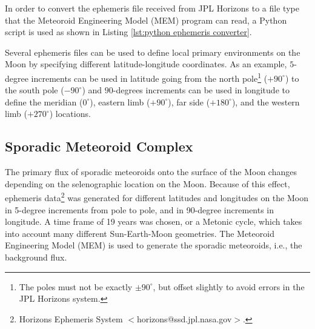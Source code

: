 \documentclass{article}
\begin{document}
In order to convert the ephemeris file received from JPL Horizons to a file type that the Meteoroid Engineering Model (MEM) program can read, a Python script is used as shown in Listing \ref{lst:python ephemeris converter}.



Several ephemeris files can be used to define local primary environments on the Moon by specifying different latitude-longitude coordinates. As an example, $5$-degree increments can be used in latitude going from the north pole\footnote{The poles must not be exactly $\pm 90^\circ$, but offset slightly to avoid errors in the JPL Horizons system.} ($+90^\circ$) to the south pole ($-90^\circ$) and $90$-degrees increments can be used in longitude to define the meridian ($0^\circ$), eastern limb ($+90^\circ$), far side ($+180^\circ$), and the western limb ($+270^\circ$) locations.



\subsection{Sporadic Meteoroid Complex}\label{ssec:Sporadic Meteoroid Complex}


The primary flux of sporadic meteoroids onto the surface of the Moon changes depending on the selenographic location on the Moon. Because of this effect, ephemeris data\footnote{Horizons Ephemeris System $<$horizons@ssd.jpl.nasa.gov$>$.} was generated for different latitudes and longitudes on the Moon in 5-degree increments from pole to pole, and in 90-degree increments in longitude. A time frame of 19 years was chosen, or a Metonic cycle, which takes into account many different Sun-Earth-Moon geometries. The Meteoroid Engineering Model (MEM) \citep{moorhead2019nasa} is used to generate the sporadic meteoroids, i.e., the background flux.
\end{document}
